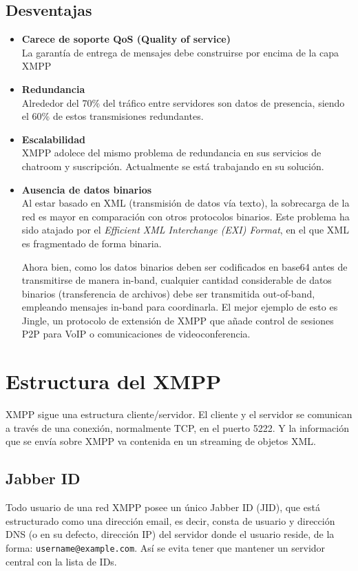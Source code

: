 \documentclass[a4paper, 11pt]{article} %
\begin{document}
   \subsection{Desventajas}
   \begin{itemize}
    \item \textbf{Carece de soporte QoS (Quality of service)}\\
    La garantía de entrega de mensajes debe construirse por encima de la capa XMPP
    \item \textbf{Redundancia}\\
    Alrededor del 70\% del tráfico entre servidores son datos de presencia, siendo el 60\% de estos transmisiones 
    redundantes.
    \item \textbf{Escalabilidad}\\
    XMPP adolece del mismo problema de redundancia en sus servicios de chatroom y suscripción. Actualmente se está
    trabajando en su solución.
    \item \textbf{Ausencia de datos binarios}\\
    Al estar basado en XML (transmisión de datos vía texto), la sobrecarga de la red es mayor en comparación 
    con otros protocolos binarios. Este problema ha sido atajado por el \textit{Efficient XML Interchange (EXI) Format},
    en el que XML es fragmentado de forma binaria.
    
    Ahora bien, como los datos binarios deben ser codificados en base64 antes de transmitirse de manera in-band,
    cualquier cantidad considerable de datos binarios (transferencia de archivos) debe ser transmitida out-of-band,
    empleando mensajes in-band para coordinarla. El mejor ejemplo de esto es Jingle, un protocolo de extensión de XMPP
    que añade control de sesiones P2P para VoIP o comunicaciones de videoconferencia.
    
   \end{itemize}


\section{Estructura del XMPP}
  XMPP sigue una estructura cliente/servidor. El cliente y el servidor se comunican a través 
  de una conexión, normalmente TCP, en el puerto 5222. Y la información que se envía sobre XMPP va contenida
  en un streaming de objetos XML.
 
  \subsection{Jabber ID}
  Todo usuario de una red XMPP posee un único Jabber ID (JID), que está estructurado como una dirección email, es decir, 
  consta de usuario y dirección DNS (o en su defecto, dirección IP) del servidor donde el usuario reside, de la forma:
  \texttt{username@example.com}. Así se evita tener que mantener un servidor central con la lista de IDs.
  
\end{document}
